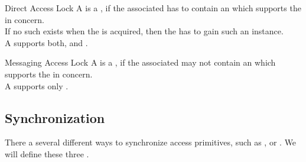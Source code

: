 \documentclass[a4paper, 12pt]{book}
\begin{document}
\begin{definition*}{Direct Access Lock}
  A  is a , if the associated
   has to contain an  which supports
  the  in concern.\\
  If no such  exists when the  is
  acquired, then the  has to gain such an instance.\\
  A  supports both,  and
  .
\end{definition*}

\begin{definition*}{Messaging Access Lock}
  A  is a , if the associated
   may not contain an  which supports
  the  in concern.\\
  A  supports only .
\end{definition*}


\subsection{Synchronization}

There a several different ways to synchronize access primitives, such as
,  or . We will define these three .
\end{document}
